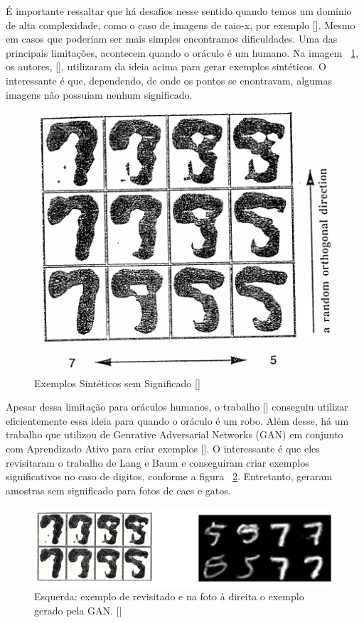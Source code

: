 É importante ressaltar que há desafios nesse sentido quando temos um domínio de alta complexidade, como o caso de imagens de raio-x, por exemplo [\cite{angluin1988queries}]. Mesmo em casos que poderiam ser mais simples encontramos dificuldades. Uma das principais limitações, acontecem quando o oráculo é um humano. Na imagem ~\ref{fig:LangBaum_5vs9Example}, os autores, [\cite{baum1992query}], utilizaram da ideia acima para gerar exemplos sintéticos. O interessante é que, dependendo, de onde os pontos se enontravam, algumas imagens não possuiam nenhum significado. 

\begin{figure}
  \centering
  \includegraphics[width=.4\textwidth]{figures/lang_baum_5_vs_9_example.png}
  \caption{Exemplos Sintéticos sem Significado [\cite{baum1992query}]}
  \label{fig:LangBaum_5vs9Example}
\end{figure}

Apesar dessa limitação para oráculos humanos, o trabalho [\cite{king2004functional, king2009automation}] conseguiu utilizar eficientemente essa ideia para quando o oráculo é um robo. Além desse, há um trabalho que utilizou de Genrative Adversarial Networks (GAN) em conjunto com Aprendizado Ativo para criar exemplos [\cite{zhu2017generative}]. O interessante é que eles revisitaram o trabalho de Lang e Baum e conseguiram criar exemplos significativos no caso de digitos, conforme a figura ~\ref{fig:GAN_5_vs_9}. Entretanto, geraram amostras sem significado para fotos de caes e gatos. 

\begin{figure}
  \centering
  \includegraphics[width=.9\textwidth]{figures/generative_GAN_AL_5_vs_9.png}
  \caption{Esquerda: exemplo de \cite{baum1992query} revisitado e na foto à direita o exemplo gerado pela GAN. [\cite{zhu2017generative}]}
  \label{fig:GAN_5_vs_9}
\end{figure}


